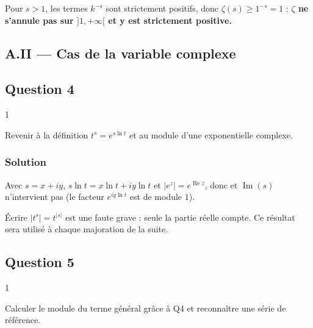 \documentclass[11pt,a4paper]{article}
\newcommand{\equationajustee}[1]{%
  \sbox{\boiteequation}{$\displaystyle #1$}%
  \ifdim\wd\boiteequation>\linewidth
    \[\resizebox{\linewidth}{!}{\usebox{\boiteequation}}\]%
  \else
    \[#1\]%
  \fi}
\begin{document}
Pour \(s>1\), les termes \(k^{-s}\) sont strictement positifs, donc \(\zeta(s)\geqslant1^{-s}=1\) :
\equationajustee{\boxed{\zeta(s)\geqslant1>0.}}
\textbf{\(\zeta\) ne s'annule pas sur \(]1,+\infty[\) et y est strictement positive.}

\hypertarget{a.ii-cas-de-la-variable-complexe}{%
\subsection{A.II --- Cas de la variable complexe}\label{a.ii-cas-de-la-variable-complexe}}

\hypertarget{question-4}{%
\subsection{Question 4}\label{question-4}}

\begin{indication}{1}

Revenir à la définition \(t^s=e^{s\ln t}\) et au module d'une exponentielle complexe.

\end{indication}

\hypertarget{solution-3}{%
\subsubsection{Solution}\label{solution-3}}

Avec \(s=x+iy\), \(s\ln t=x\ln t+iy\ln t\) et \(|e^z|=e^{\operatorname{Re}z}\), donc
\equationajustee{\boxed{|t^s|=t^{\operatorname{Re}(s)}}}
et \(\operatorname{Im}(s)\) n'intervient pas (le facteur \(e^{iy\ln t}\) est de module \(1\)).

\begin{piege}

Écrire \(|t^s|=t^{|s|}\) est une faute grave : seule la partie réelle compte. Ce résultat sera utilisé à chaque majoration de la suite.

\end{piege}

\hypertarget{question-5}{%
\subsection{Question 5}\label{question-5}}

\begin{indication}{1}

Calculer le module du terme général grâce à Q4 et reconnaître une série de référence.

\end{indication}
\end{document}
